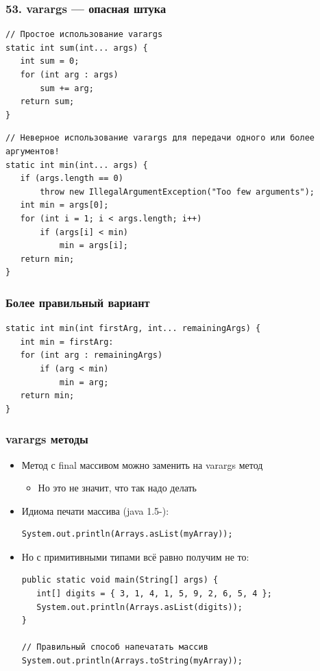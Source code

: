 \documentclass[xetex,mathserif,serif]{beamer}
\begin{document}
	\begin{frame}[fragile]
		\frametitle{53. varargs --- опасная штука}
		\begin{footnotesize}
			\begin{verbatim}
// Простое использование varargs
static int sum(int... args) {
   int sum = 0;
   for (int arg : args)
       sum += arg;
   return sum;
}
			\end{verbatim}
			\pause
			\begin{verbatim}
// Неверное использование varargs для передачи одного или более аргументов!
static int min(int... args) {
   if (args.length == 0)
       throw new IllegalArgumentException("Too few arguments");
   int min = args[0];
   for (int i = 1; i < args.length; i++)
       if (args[i] < min)
           min = args[i];
   return min;
}
			\end{verbatim}
		\end{footnotesize}
	\end{frame}

	\begin{frame}[fragile]
		\frametitle{Более правильный вариант}
		\begin{verbatim}
static int min(int firstArg, int... remainingArgs) {
   int min = firstArg:
   for (int arg : remainingArgs)
       if (arg < min)
           min = arg;
   return min;
}
		\end{verbatim}
	\end{frame}

	\begin{frame}[fragile]
		\frametitle{varargs методы}
		\begin{itemize}
			\item Метод с final массивом можно заменить на varargs метод
			\begin{itemize}
				\item Но это не значит, что так надо делать
			\end{itemize}
			\item Идиома печати массива (java 1.5-):
				\begin{verbatim}
System.out.println(Arrays.asList(myArray));
				\end{verbatim}
			\item Но с примитивными типами всё равно получим не то:
				\begin{verbatim}
public static void main(String[] args) {
   int[] digits = { 3, 1, 4, 1, 5, 9, 2, 6, 5, 4 };
   System.out.println(Arrays.asList(digits));
}

// Правильный способ напечатать массив
System.out.рrintln(Arrays.toString(myArray));
				\end{verbatim}
		\end{itemize}
	\end{frame}
\end{document}
